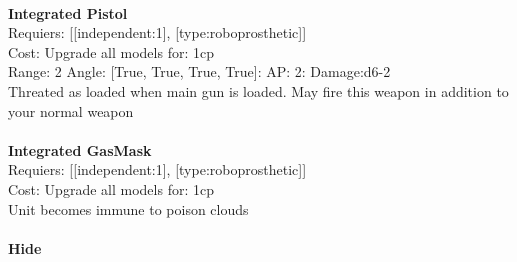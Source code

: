 \ \\
{\bf Integrated Pistol } \\

Requiers: [[independent:1], [type:roboprosthetic]] \\
Cost: Upgrade all models for: 1cp \\


Range: 2  Angle: [True, True, True, True]: AP: 2: Damage:d6-2 \\
Threated as loaded when main gun is loaded. May fire this weapon in addition to your normal weapon\\ 








\ \\
{\bf Integrated GasMask } \\

Requiers: [[independent:1], [type:roboprosthetic]] \\
Cost: Upgrade all models for: 1cp \\
Unit becomes immune to poison clouds\\ 









\ \\
{\bf Hide } \\


